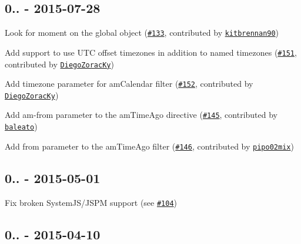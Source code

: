\subsection*{0.. -\/ 2015-\/07-\/28}


\begin{DoxyItemize}
\item Look for {\ttfamily moment} on the {\ttfamily global} object (\href{https://github.com/urish/angular-moment/pull/133}{\tt \#133}, contributed by \href{https://github.com/kitbrennan90}{\tt kitbrennan90})
\item Add support to use U\+TC offset timezones in addition to named timezones (\href{https://github.com/urish/angular-moment/pull/151}{\tt \#151}, contributed by \href{https://github.com/DiegoZoracKy}{\tt Diego\+Zorac\+Ky})
\item Add timezone parameter for am\+Calendar filter (\href{https://github.com/urish/angular-moment/pull/152}{\tt \#152}, contributed by \href{https://github.com/DiegoZoracKy}{\tt Diego\+Zorac\+Ky})
\item Add {\ttfamily am-\/from} parameter to the {\ttfamily am\+Time\+Ago} directive (\href{https://github.com/urish/angular-moment/pull/145}{\tt \#145}, contributed by \href{https://github.com/baleato}{\tt baleato})
\item Add {\ttfamily from} parameter to the {\ttfamily am\+Time\+Ago} filter (\href{https://github.com/urish/angular-moment/pull/146}{\tt \#146}, contributed by \href{https://github.com/pipo02mix}{\tt pipo02mix})
\end{DoxyItemize}

\subsection*{0.. -\/ 2015-\/05-\/01}


\begin{DoxyItemize}
\item Fix broken System\+J\+S/\+J\+S\+PM support (see \href{https://github.com/urish/angular-moment/issues/104}{\tt \#104})
\end{DoxyItemize}

\subsection*{0.. -\/ 2015-\/04-\/10}


